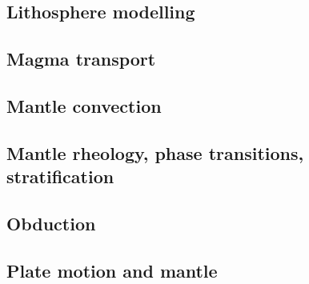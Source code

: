 \cite{algs12}

\subsection*{Lithosphere modelling}

\cite{nefo93}
\cite{afrf07}
\cite{affr08}

\subsection*{Magma transport}

\cite{yatd12}

\subsection*{Mantle convection}

\cite{olco80}
\cite{jamc80}
\cite{jape82}
\cite{olyb84}
\cite{jarv84}
\cite{jarv85}
\cite{yuqh87}
\cite{zhch93}
\cite{jarv93}
\cite{zhgu95}
\cite{zhyu96}
\cite{iwho97}
\cite{ande98}
\cite{iwho98}
\cite{zhzm00}
\cite{nake07}
\cite{albe00}
\cite{arfw14}

\subsection*{Mantle rheology, phase transitions, stratification}

\cite{yusb82}
\cite{zhyh92}
\cite{zhyu95}
\cite{java11}

\subsection*{Obduction}

\cite{agzf14}

\subsection*{Plate motion and mantle}

\cite{zieg92a}
\cite{zhgm98}
\cite{yoha15}

